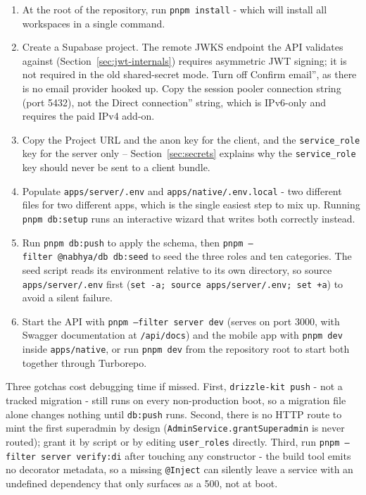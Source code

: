 \begin{enumerate}[itemsep=0.15em, topsep=0.25em, parsep=0.1em]
  \item At the root of the repository, run \texttt{pnpm install} - which will install all workspaces in a single command.
 \item Create a Supabase project. The remote JWKS endpoint the API validates against (Section~\ref{sec:jwt-internals}) requires asymmetric JWT signing; it is not required in the old shared-secret mode. Turn off Confirm email'', as there is no email provider hooked up. Copy the session pooler connection string (port 5432), not the Direct connection'' string, which is IPv6-only and requires the paid IPv4 add-on. 
  \item Copy the Project URL and the anon key for the client, and the \texttt{service\_\allowbreak role} key for the server only -- Section~\ref{sec:secrets} explains why the \texttt{service\_\allowbreak role} key should never be sent to a client\allowbreak{} bundle.
  \item Populate \texttt{apps/\allowbreak server/\allowbreak .env} and \texttt{apps/\allowbreak native/\allowbreak .env.local} - two different files for two different apps, which is the single easiest step to mix up. Running \texttt{pnpm db:setup} runs an interactive wizard that writes both correctly instead.
  \item Run \texttt{pnpm db:push} to apply the schema, then \texttt{pnpm --filter\allowbreak\ @nabhya/db\allowbreak\ db:seed} to seed the three roles and ten categories. The seed script reads its environment relative to its own directory, so source \texttt{apps/\allowbreak server/\allowbreak .env} first (\texttt{set -a;\allowbreak\ source\allowbreak\ apps/\allowbreak server/\allowbreak .env;\allowbreak\ set +a}) to avoid a silent failure.
  \item Start the API with \texttt{pnpm --filter\allowbreak\ server dev} (serves on port 3000, with Swagger documentation at \texttt{/api/\allowbreak docs}) and the mobile app with \texttt{pnpm dev} inside \texttt{apps/\allowbreak native}, or run \texttt{pnpm dev} from the repository root to start both together through Turborepo.
\end{enumerate}

\noindent Three gotchas cost debugging time if missed. First, \texttt{drizzle-kit push} - not a tracked migration - still runs on every non-production boot, so a migration file alone changes nothing until \texttt{db:push} runs. Second, there is no HTTP route to mint the first superadmin by design (\texttt{AdminService.\allowbreak grantSuperadmin} is never routed); grant it by script or by editing \texttt{user\_roles} directly. Third, run \texttt{pnpm --filter\allowbreak\ server\allowbreak\ verify:di} after touching any constructor - the build tool emits no decorator metadata, so a missing \texttt{@Inject} can silently leave a service with an undefined dependency that only surfaces as a 500, not at boot.

